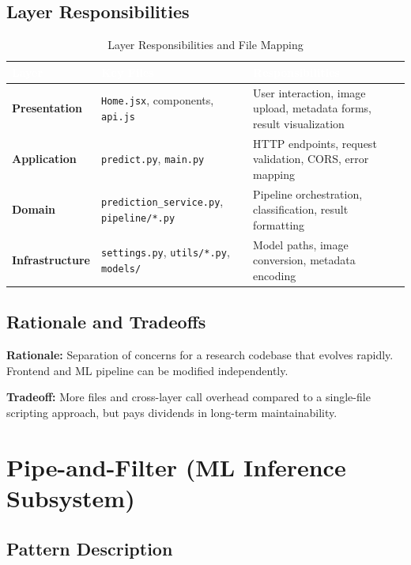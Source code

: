 \documentclass[11pt,a4paper,oneside]{report}
\newcommand{\file}[1]{\texttt{\footnotesize #1}}
\begin{document}
\subsection{Layer Responsibilities}

\begin{table}[H]
\centering\footnotesize
\caption{Layer Responsibilities and File Mapping}
\label{tab:layer-map}
\begin{tabularx}{\textwidth}{>{\bfseries}p{2cm} p{4cm} X}
\toprule
\rowcolor{tableheader}
\textcolor{white}{Layer} & \textcolor{white}{Key Files} & \textcolor{white}{Responsibilities} \\
\midrule
Presentation & \file{Home.jsx}, components, \file{api.js} & User interaction, image upload, metadata forms, result visualization \\
Application  & \file{predict.py}, \file{main.py} & HTTP endpoints, request validation, CORS, error mapping \\
Domain       & \file{prediction\_service.py}, \file{pipeline/*.py} & Pipeline orchestration, classification, result formatting \\
Infrastructure & \file{settings.py}, \file{utils/*.py}, \file{models/} & Model paths, image conversion, metadata encoding \\
\bottomrule
\end{tabularx}
\end{table}

\subsection{Rationale and Tradeoffs}

\textbf{Rationale:} Separation of concerns for a research codebase that evolves rapidly. Frontend and ML pipeline can be modified independently.

\textbf{Tradeoff:} More files and cross-layer call overhead compared to a single-file scripting approach, but pays dividends in long-term maintainability.

\section{Pipe-and-Filter (ML Inference Subsystem)}

\subsection{Pattern Description}
\end{document}
